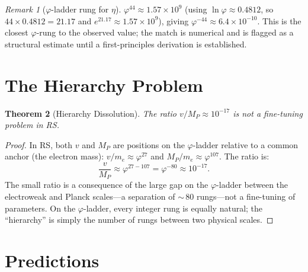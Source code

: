\documentclass[12pt,a4paper]{article}
\newtheorem{theorem}{Theorem}[section]
\theoremstyle{definition}
\theoremstyle{remark}
\newtheorem{remark}[theorem]{Remark}
\begin{document}
\begin{remark}[$\varphi$-ladder rung for $\eta$]
$\varphi^{44} \approx 1.57 \times 10^9$ (using $\ln\varphi \approx
0.4812$, so $44 \times 0.4812 = 21.17$ and $e^{21.17} \approx
1.57 \times 10^9$), giving $\varphi^{-44} \approx 6.4 \times
10^{-10}$.  This is the closest $\varphi$-rung to the observed
value; the match is numerical and is flagged as a structural
estimate until a first-principles derivation is established.
\end{remark}

\section{The Hierarchy Problem}
\label{sec:hierarchy}

\begin{theorem}[Hierarchy Dissolution]
The ratio $v/M_P \approx 10^{-17}$ is not a fine-tuning problem in
RS.
\end{theorem}

\begin{proof}
In RS, both $v$ and $M_P$ are positions on the $\varphi$-ladder
relative to a common anchor (the electron mass):
$v/m_e \approx \varphi^{27}$ and
$M_P/m_e \approx \varphi^{107}$.
The ratio is:
\begin{equation}
  \frac{v}{M_P} \approx \varphi^{27 - 107} = \varphi^{-80}
  \approx 10^{-17}.
\end{equation}
The small ratio is a consequence of the large gap on the
$\varphi$-ladder between the electroweak and Planck scales---a
separation of ${\sim}\,80$ rungs---not a fine-tuning of
parameters.  On the $\varphi$-ladder, every integer rung is
equally natural; the ``hierarchy'' is simply the number of
rungs between two physical scales.
\end{proof}

\section{Predictions}
\label{sec:predictions}
\end{document}
